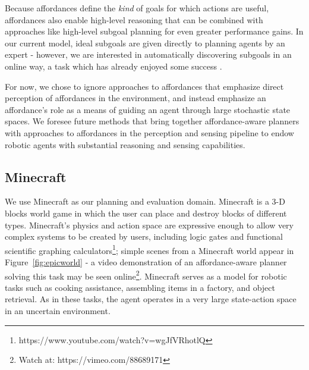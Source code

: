 \documentclass[letterpaper]{article}
\begin{document}
Because affordances define the {\em kind} of goals for which actions are useful,
affordances also enable high-level reasoning that can
be combined with approaches like high-level subgoal planning for even
greater performance gains. In our current model, ideal subgoals are given directly
to planning agents by an expert - however, we are interested in automatically
discovering subgoals in an online way, a task which has already enjoyed some success \cite{Mcgovern01automaticdiscovery,Simsek:2005:IUS:1102351.1102454}.

For now, we chose to ignore approaches to affordances that emphasize
direct perception of affordances in the environment, and instead emphasize an
affordance's role as a means of guiding an agent through large stochastic state spaces. We foresee
future methods that bring together affordance-aware planners with approaches to affordances
in the perception and sensing pipeline to endow robotic agents with substantial reasoning and sensing capabilities.

\subsection{Minecraft}

We use Minecraft as our planning and evaluation domain. Minecraft is a
3-D blocks world game in which the user can place and destroy blocks
of different types.  Minecraft's physics and action space are expressive
enough to allow very complex systems to be created by users, including logic gates and 
functional scientific graphing calculators\footnote{https://www.youtube.com/watch?v=wgJfVRhotlQ};
simple scenes from a Minecraft world appear in Figure~\ref{fig:epicworld} - a video demonstration of
an affordance-aware planner solving this task may be seen online\footnote{Watch at: https://vimeo.com/88689171}.
Minecraft serves as a model for robotic tasks such as cooking assistance, assembling items in a factory, 
and object retrieval.  As in these tasks, the agent operates in a very large state-action space in an uncertain environment.
\end{document}
